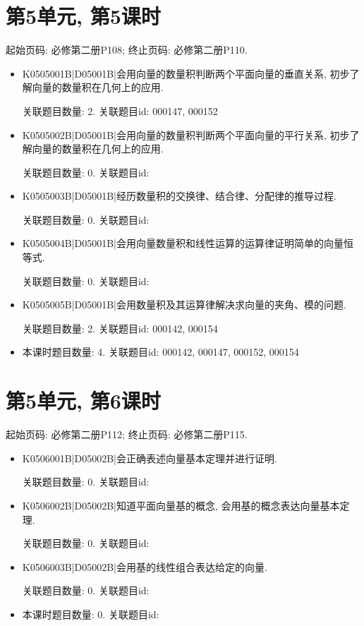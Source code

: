 \section*{第5单元, 第5课时}
起始页码: 必修第二册P108; 终止页码: 必修第二册P110.
\begin{itemize}
\item K0505001B|D05001B|会用向量的数量积判断两个平面向量的垂直关系, 初步了解向量的数量积在几何上的应用.

关联题目数量: 2. 关联题目id: 000147, 000152

\item K0505002B|D05001B|会用向量的数量积判断两个平面向量的平行关系, 初步了解向量的数量积在几何上的应用.

关联题目数量: 0. 关联题目id: 

\item K0505003B|D05001B|经历数量积的交换律、结合律、分配律的推导过程.

关联题目数量: 0. 关联题目id: 

\item K0505004B|D05001B|会用向量数量积和线性运算的运算律证明简单的向量恒等式.

关联题目数量: 0. 关联题目id: 

\item K0505005B|D05001B|会用数量积及其运算律解决求向量的夹角、模的问题.

关联题目数量: 2. 关联题目id: 000142, 000154

\item 本课时题目数量: 4. 关联题目id: 000142, 000147, 000152, 000154

\end{itemize}

\section*{第5单元, 第6课时}
起始页码: 必修第二册P112; 终止页码: 必修第二册P115.
\begin{itemize}
\item K0506001B|D05002B|会正确表述向量基本定理并进行证明.

关联题目数量: 0. 关联题目id: 

\item K0506002B|D05002B|知道平面向量基的概念, 会用基的概念表达向量基本定理.

关联题目数量: 0. 关联题目id: 

\item K0506003B|D05002B|会用基的线性组合表达给定的向量.

关联题目数量: 0. 关联题目id: 

\item 本课时题目数量: 0. 关联题目id: 

\end{itemize}

